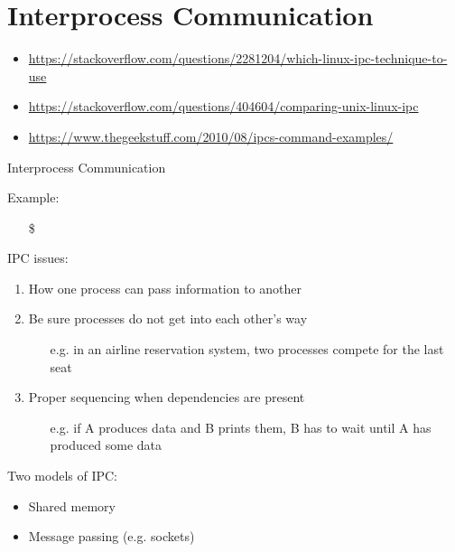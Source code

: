 \mode*
\part{Interprocess Communication}

\begin{itemize}
\item \url{https://stackoverflow.com/questions/2281204/which-linux-ipc-technique-to-use}
\item \url{https://stackoverflow.com/questions/404604/comparing-unix-linux-ipc}
\item \url{https://www.thegeekstuff.com/2010/08/ipcs-command-examples/}
\end{itemize}

\begin{frame}{Interprocess Communication}
  \begin{iblock}{Example:}
    \begin{itemize}
    \item[\$] 
    \end{itemize}
  \end{iblock}
  \begin{block}{IPC issues:}
    \begin{enumerate}
    \item How one process can pass information to another
    \item Be sure processes do not get into each other's way
      \begin{itemize}
      \item[e.g.] in an airline reservation system, two processes compete for the last
        seat
      \end{itemize}
    \item Proper sequencing when dependencies are present
      \begin{itemize}
      \item[e.g.] if A produces data and B prints them, B has to wait until A has produced
        some data
      \end{itemize}
    \end{enumerate}
  \end{block}
  \begin{block}{Two models of IPC:}
    \begin{itemize}
    \item Shared memory
    \item Message passing (e.g. sockets)
    \end{itemize}
  \end{block}
\end{frame}

